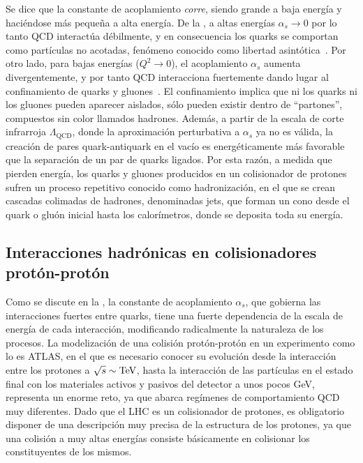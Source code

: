 Se dice que la constante de acoplamiento \textit{corre}, siendo grande a baja energía y haciéndose más pequeña a alta energía. De la \Eqn{\ref{eq:theory:sm:mathematical:qcd:alphas}}, a altas energías \(\alpha_s \to 0\) por lo tanto \ac{QCD} interactúa débilmente, y en consecuencia los quarks se comportan como partículas no acotadas, fenómeno conocido como libertad asintótica~\cite{Wilczek_Gross-1973,Politzer-1973}.
Por otro lado, para bajas energías (\(Q^2 \to 0\)), el acoplamiento \(\alpha_s\) aumenta divergentemente, y por tanto \ac{QCD} interacciona fuertemente dando lugar al confinamiento de quarks y gluones~\cite{Glashow_Georgi-1974}. El confinamiento implica que ni los quarks ni los gluones pueden aparecer aislados, sólo pueden existir dentro de \enquote{partones}, compuestos sin color llamados hadrones.
Además, a partir de la escala de corte infrarroja \(\Lambda_{\text{QCD}}\), donde la aproximación perturbativa a \(\alpha_s\) ya no es válida, la creación de pares quark-antiquark en el vacío es energéticamente más favorable que la separación de un par de quarks ligados. Por esta razón, a medida que pierden energía, los quarks y gluones producidos en un colisionador de protones sufren un proceso repetitivo conocido como hadronización, en el que se crean cascadas colimadas de hadrones, denominadas jets, que forman un cono desde el quark o gluón inicial hasta los calorímetros, donde se deposita toda su energía.


\subsection{Interacciones hadr\'onicas en colisionadores prot\'on-prot\'on}
\label{subsec:theory:sm:hadron_interactions}

Como se discute en la \Sect{\ref{subsubsec:theory:sm:mathematical:qcd}}, la constante de acoplamiento \(\alpha_s\), que gobierna las interacciones fuertes entre quarks, tiene una fuerte dependencia de la escala de energía de cada interacción, modificando radicalmente la naturaleza de los procesos. La modelización de una colisión protón-protón en un experimento como lo es \ac{ATLAS}, en el que es necesario conocer su evolución desde la interacción entre los protones a \(\sqrt{s} \sim \text{TeV}\), hasta la interacción de las partículas en el estado final con los materiales activos y pasivos del detector a unos pocos GeV, representa un enorme reto, ya que abarca regímenes de comportamiento \ac{QCD} muy diferentes. Dado que el \ac{LHC} es un colisionador de protones, es obligatorio disponer de una descripción muy precisa de la estructura de los protones, ya que una colisión \pp a muy altas energías consiste básicamente en colisionar los constituyentes de los mismos.

